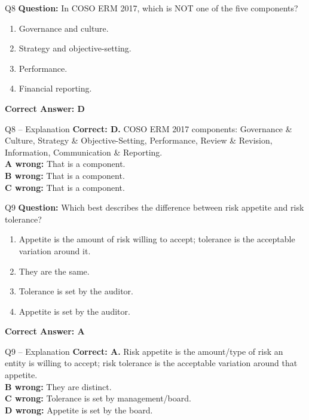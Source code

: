 \documentclass[aspectratio=169,10pt]{beamer}
\begin{document}
	\begin{frame}[t]{Q8}
		\small
		\textbf{Question:} In COSO ERM 2017, which is NOT one of the five components?
		\begin{enumerate}[label=\Alph*.,itemsep=1pt,topsep=2pt]
			\item Governance and culture.
			\item Strategy and objective-setting.
			\item Performance.
			\item Financial reporting.
		\end{enumerate}
		\vspace{4pt}
		\textbf{Correct Answer: D}
	\end{frame}
	
	\begin{frame}[t]{Q8 -- Explanation}
		\small
		\textbf{Correct: D.} COSO ERM 2017 components: Governance \& Culture, Strategy \& Objective-Setting, Performance, Review \& Revision, Information, Communication \& Reporting. \\[4pt]
		\textbf{A wrong:} That is a component. \\[2pt]
		\textbf{B wrong:} That is a component. \\[2pt]
		\textbf{C wrong:} That is a component.
	\end{frame}
	
	\begin{frame}[t]{Q9}
		\small
		\textbf{Question:} Which best describes the difference between risk appetite and risk tolerance?
		\begin{enumerate}[label=\Alph*.,itemsep=1pt,topsep=2pt]
			\item Appetite is the amount of risk willing to accept; tolerance is the acceptable variation around it.
			\item They are the same.
			\item Tolerance is set by the auditor.
			\item Appetite is set by the auditor.
		\end{enumerate}
		\vspace{4pt}
		\textbf{Correct Answer: A}
	\end{frame}
	
	\begin{frame}[t]{Q9 -- Explanation}
		\small
		\textbf{Correct: A.} Risk appetite is the amount/type of risk an entity is willing to accept; risk tolerance is the acceptable variation around that appetite. \\[4pt]
		\textbf{B wrong:} They are distinct. \\[2pt]
		\textbf{C wrong:} Tolerance is set by management/board. \\[2pt]
		\textbf{D wrong:} Appetite is set by the board.
	\end{frame}
	
\end{document}
